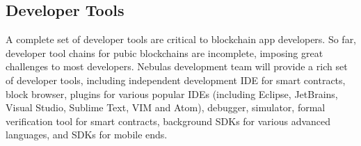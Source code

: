 
\subsection{Developer Tools}

A complete set of developer tools are critical to blockchain app developers. So far, developer tool chains for pubic blockchains are incomplete, imposing great challenges to most developers. Nebulas development team will provide a rich set of developer tools, including independent development IDE for smart contracts, block browser, plugins for various popular IDEs (including Eclipse, JetBrains, Visual Studio, Sublime Text, VIM and Atom), debugger, simulator, formal verification tool for smart contracts, background SDKs for various advanced languages, and SDKs for mobile ends.

